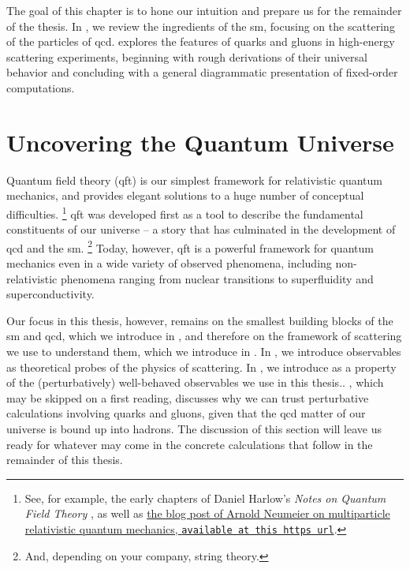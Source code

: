 The goal of this chapter is to hone our intuition and prepare us for the remainder of the thesis.
%
In , we review the ingredients of the \gls{sm}, focusing on the scattering of the particles of \gls{qcd}.
%
 explores the features of quarks and gluons in high-energy scattering experiments, beginning with rough derivations of their universal behavior and concluding with a general diagrammatic presentation of fixed-order computations.



\section{Uncovering the Quantum Universe}
\label{sec:sm-scattering-review}

Quantum field theory (\gls{qft}) is our simplest framework for relativistic quantum mechanics, and provides elegant solutions to a huge number of conceptual difficulties.%
\footnote{
See, for example, the early chapters of Daniel Harlow's  \textit{Notes on Quantum Field Theory} \cite{}, as well as \href{https://arnold-neumaier.at/physfaq/topics/multi.html}{the blog post of Arnold Neumeier on multiparticle relativistic quantum mechanics, \texttt{available at this https url}}.
}
%
\Gls{qft} was developed first as a tool to describe the fundamental constituents of our universe -- a story that has culminated in the development of \gls{qcd} and the \gls{sm}.%
\footnote{
    And, depending on your company, string theory.
}
%
Today, however, \gls{qft} is a powerful framework for quantum mechanics even in a wide variety of observed phenomena, including non-relativistic phenomena ranging from nuclear transitions to superfluidity and superconductivity.

Our focus in this thesis, however, remains on the smallest building blocks of the \gls{sm} and \gls{qcd}, which we introduce in , and therefore on the framework of \gls{scattering} we use to understand them, which we introduce in .
%
In , we introduce \glspl{observable} as theoretical probes of the physics of scattering.
%
In , we introduce  as a property of the (perturbatively) well-behaved \glspl{observable} we use in this thesis..
%
, which may be skipped on a first reading, discusses why we can trust perturbative calculations involving quarks and gluons, given that the \gls{qcd} matter of our universe is bound up into hadrons.
%
The discussion of this section will leave us ready for whatever may come in the concrete calculations that follow in the remainder of this thesis.


